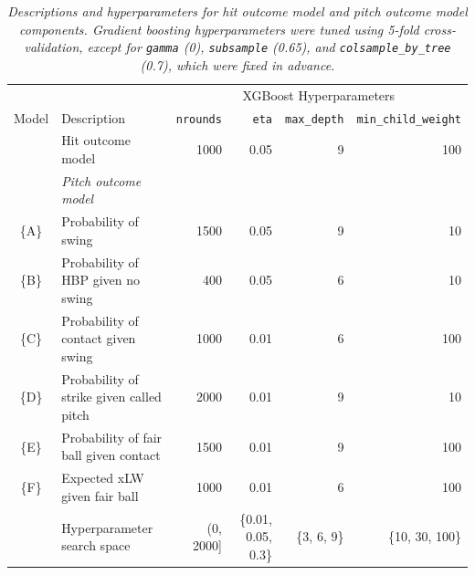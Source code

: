 \documentclass{article}
\begin{document}
        \begin{table}
          \hspace{-6mm}
          \begin{tabular}{cl|rrrr}
                  &                                             & \multicolumn{4}{c}{XGBoost Hyperparameters}\\
            Model & Description                                 & \texttt{nrounds}  & \texttt{eta}        & \texttt{max\_depth} & \texttt{min\_child\_weight}\\
            \hline        
                  & Hit outcome model                           & 1000              & 0.05                & 9                   & 100\\
            \hline        
                  & {\it Pitch outcome model}\\
            \{A\} & Probability of swing                        & 1500              & 0.05                & 9                   & 10\\
            \{B\} & Probability of HBP given no swing  &  400              & 0.05                & 6                   & 10\\
            \{C\} & Probability of contact given swing          & 1000              & 0.01                & 6                   & 100\\
            \{D\} & Probability of strike given called pitch    & 2000              & 0.01                & 9                   & 10\\
            \{E\} & Probability of fair ball given contact      & 1500              & 0.01                & 9                   & 100\\
            \{F\} & Expected xLW given fair ball                & 1000              & 0.01                & 6                   & 100\\
            \hline
                & Hyperparameter search space                   & (0, 2000]         & \{0.01, 0.05, 0.3\} & \{3, 6, 9\}         & \{10, 30, 100\}
          \end{tabular}
          \caption{\it Descriptions and hyperparameters for hit outcome model and pitch outcome model components. Gradient boosting hyperparameters were tuned using 5-fold cross-validation, except for \texttt{gamma} (0), \texttt{subsample} (0.65), and \texttt{colsample\_by\_tree} (0.7), which were fixed in advance.}
          \label{tab:xgboost-hyperparameters}
        \end{table}
        
\end{document}
